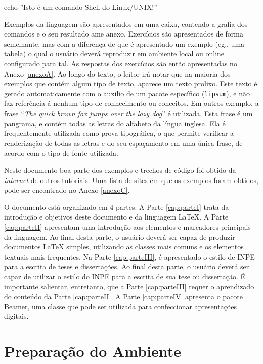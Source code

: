 \begin{commandshell}
echo ''Isto é um comando Shell do Linux/UNIX!''
\end{commandshell}

Exemplos da linguagem são apresentados em uma caixa, contendo a grafia dos comandos e o seu resultado ame anexo. Exercícios são apresentados de forma semelhante, mas com a diferença de que é apresentado um exemplo (eg., uma tabela) o qual o usuário deverá reproduzir em ambiente local ou online configurado para tal. As respostas dos exercícios são então apresentadas no Anexo \ref{anexoA}. Ao longo do texto, o leitor irá notar que na maioria dos exemplos que contém algum tipo de texto, aparece um texto prolixo. Este texto é gerado automaticamente com o auxílio de um pacote específico ({\tt lipsum}), e não faz referência á nenhum tipo de conhecimento ou conceitos. Em outros exemplo, a frase ``\textit{The quick brown fox jumps over the lazy dog}'' é utilizada. Esta frase é um pangrama, e contém todas as letras do alfabeto da língua inglesa. Ela é frequentemente utilizada como prova tipográfica, o que permite verificar a renderização de todas as letras e do seu espaçamento em uma única frase, de acordo com o tipo de fonte utilizada.

Neste documento boa parte dos exemplos e trechos de código foi obtido da \textit{internet} de outros tutoriais. Uma lista de sites em que os exemplos foram obtidos, pode ser encontrado no Anexo \ref{anexoC}.

O documento está organizado em 4 partes. A Parte \ref{cap:parteI} trata da introdução e objetivos deste documento e da linguagem LaTeX. A Parte \ref{cap:parteII} apresentam uma introdução aos elementos e marcadores principais da linguagem. Ao final desta parte, o usuário deverá ser capaz de produzir documentos LaTeX simples, utilizando as classes mais comuns e os elementos textuais mais frequentes. Na Parte \ref{cap:parteIII}, é apresentado o estilo de INPE para a escrita de teses e dissertações. Ao final desta parte, o usuário deverá ser capaz de utilizar o estilo do INPE para a escrita de sua tese ou dissertação. É importante salientar, entretanto, que a Parte \ref{cap:parteIII} requer o aprendizado do conteúdo da Parte \ref{cap:parteII}. A Parte \ref{cap:parteIV} apresenta o pacote Beamer, uma classe que pode ser utilizada para confeccionar apresentações digitais.

\section{Preparação do Ambiente}
\label{sec:prepara}

